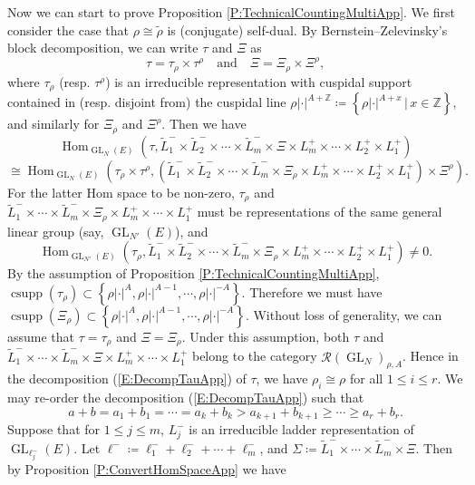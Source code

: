 \documentclass[11pt,letterpaper]{amsart}
\theoremstyle{plain}
\numberwithin{theorem}{section}
\numberwithin{equation}{subsection}
\theoremstyle{remark}
\newcommand{\Hom}{\operatorname{Hom}}
\newcommand{\GL}{\operatorname{GL}}
\newcommand{\csupp}{\operatorname{csupp}} %
\newcommand{\Z}{\mathbb{Z}}
\def\calR{\mathcal{R}}
\begin{document}
Now we can start to prove Proposition \ref{P:TechnicalCountingMultiApp}. We first consider the case that $\rho\cong\widetilde{\rho}$ is (conjugate) self-dual. By Bernstein--Zelevinsky's block decomposition, we can write $\tau$ and $\Xi$ as
\[
    \tau = \tau_\rho\times\tau^\rho \quad \text{and} \quad \Xi = \Xi_\rho\times \Xi^\rho,
\]
where $\tau_\rho$ (resp. $\tau^\rho$) is an irreducible representation with cuspidal support contained in (resp. disjoint from) the cuspidal line $\rho|\cdot|^{A+\Z}\coloneqq\left\{\rho|\cdot|^{A+x}\,\big|\,x\in\Z\right\}$, and similarly for $\Xi_\rho$ and $\Xi^\rho$. Then we have
\[
    \Hom_{\GL_N\left(E\right)}\left(\tau, \widetilde{L}^-_1\times\widetilde{L}^-_2\times\cdots\times\widetilde{L}^-_m\times\Xi\times L^+_m\times\cdots\times L_2^+\times L_1^+\right)
\]
\[
    \cong \Hom_{\GL_N\left(E\right)}\left(\tau_\rho\times\tau^\rho, \left(\widetilde{L}^-_1\times\widetilde{L}^-_2\times\cdots\times\widetilde{L}^-_m\times\Xi_\rho\times L^+_m\times\cdots\times L_2^+\times L_1^+\right)\times\Xi^\rho\right).
\]
For the latter Hom space to be non-zero, $\tau_\rho$ and $\widetilde{L}^-_1\times\cdots\times\widetilde{L}^-_m\times\Xi_\rho\times L^+_m\times\cdots\times L_1^+$ must be representations of the same general linear group (say, $\GL_{N'}\left(E\right)$), and 
\[
    \Hom_{\GL_{N'}\left(E\right)}\left(\tau_\rho, \widetilde{L}^-_1\times\widetilde{L}^-_2\times\cdots\times\widetilde{L}^-_m\times\Xi_\rho\times L^+_m\times\cdots\times L_2^+\times L_1^+\right)\neq0.
\]
By the assumption of Proposition \ref{P:TechnicalCountingMultiApp}, $\csupp\left(\tau_\rho\right)\subset \left\{\rho|\cdot|^A, \rho|\cdot|^{A-1},\cdots,\rho|\cdot|^{-A}\right\}$. Therefore we must have $\csupp\left(\Xi_\rho\right)\subset \left\{\rho|\cdot|^A, \rho|\cdot|^{A-1},\cdots,\rho|\cdot|^{-A}\right\}$. Without loss of generality, we can assume that $\tau=\tau_\rho$ and $\Xi=\Xi_\rho$. Under this assumption, both $\tau$ and $\widetilde{L}^-_1\times\cdots\times\widetilde{L}^-_m\times\Xi\times L^+_m\times\cdots\times L_1^+$ belong to the category $\calR\left(\GL_N\right)_{\rho,A}$. Hence in the decomposition (\ref{E:DecompTauApp}) of $\tau$, we have $\rho_i\cong \rho$ for all $1\leq i\leq r$. We may re-order the decomposition (\ref{E:DecompTauApp}) such that
\[
    a+b=a_1+b_1=\cdots=a_k+b_k>a_{k+1}+b_{k+1}\geq\cdots\geq a_r+b_r.
\]
Suppose that for $1\leq j\leq m$, $L^-_j$ is an irreducible ladder representation of $\GL_{\ell^-_j}\left(E\right)$. Let $\ell^-\coloneqq \ell^-_1+\ell^-_2+\cdots+\ell^-_m$, and $\Sigma\coloneqq\widetilde{L}^-_1\times\cdots\times\widetilde{L}^-_m\times\Xi$. Then by Proposition \ref{P:ConvertHomSpaceApp} we have
\end{document}
